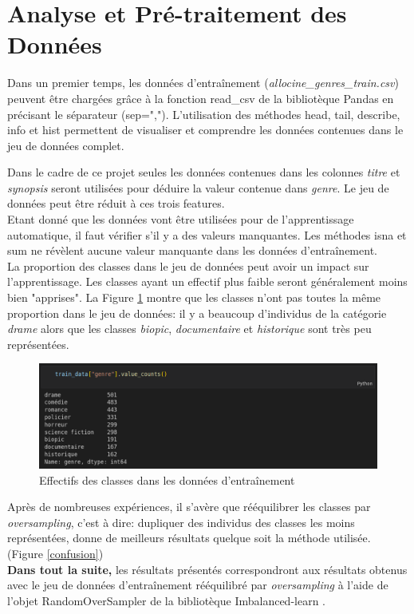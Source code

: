 \section{Analyse et Pré-traitement des Données}
Dans un premier temps, les données d'entraînement (\textit{allocine\_genres\_train.csv}) peuvent être chargées grâce à la fonction \textsf{read\_csv} de la bibliotèque Pandas \cite{pandas} en précisant le séparateur (\textsf{sep=","}). L'utilisation des méthodes \textsf{head}, \textsf{tail}, \textsf{describe}, \textsf{info} et \textsf{hist} permettent de visualiser et comprendre les données contenues dans le jeu de données complet.

Dans le cadre de ce projet seules les données contenues dans les colonnes \textit{titre} et \textit{synopsis} seront utilisées pour déduire la valeur contenue dans \textit{genre}. Le jeu de données peut être réduit à ces trois features.\\
Etant donné que les données vont être utilisées pour de l'apprentissage automatique, il faut vérifier s'il y a des valeurs manquantes. Les méthodes \textsf{isna} et \textsf{sum} ne révèlent aucune valeur manquante dans les données d'entraînement.\\
La proportion des classes dans le jeu de données peut avoir un impact sur l'apprentissage. Les classes ayant un effectif plus faible seront généralement moins bien "apprises". La Figure \ref{value_counts} montre que les classes n'ont pas toutes la même proportion dans le jeu de données: il y a beaucoup d'individus de la catégorie \textit{drame} alors que les classes \textit{biopic}, \textit{documentaire} et \textit{historique} sont très peu représentées.

\begin{figure}
    \center
    \includegraphics[scale=.3]{img/value_counts.png}
    \caption{Effectifs des classes dans les données d'entraînement}
    \label{value_counts}
\end{figure}

Après de nombreuses expériences, il s'avère que rééquilibrer les classes par \textit{oversampling}, c'est à dire: dupliquer des individus des classes les moins représentées, donne de meilleurs résultats quelque soit la méthode utilisée. (Figure \ref{confusion})\\
\textbf{Dans tout la suite,} les résultats présentés correspondront aux résultats obtenus avec le jeu de données d'entraînement rééquilibré par \textit{oversampling} à l'aide de l'objet \textsf{RandomOverSampler} de la bibliotèque Imbalanced-learn \cite{imbalanced_learn}.

